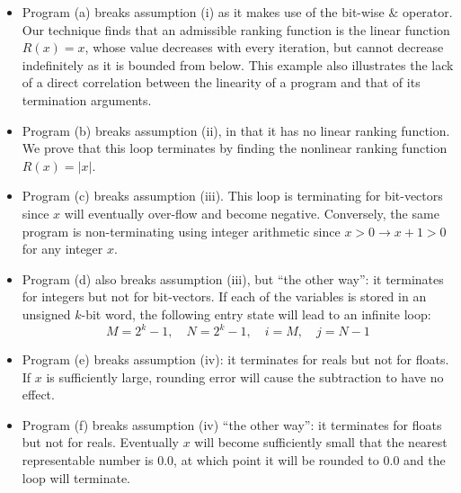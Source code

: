 \documentclass[preprint]{sigplanconf}
\theoremstyle{definition}
\begin{document}
%
\begin{itemize}

\item Program (a) breaks assumption (i) as it makes use of the bit-wise $\&$ operator.
%
Our technique finds that an admissible ranking function is the linear
function $R(x) = x$, whose value decreases with every iteration, but cannot
decrease indefinitely as it is bounded from below.  This example also
illustrates the lack of a direct correlation between the linearity of a
program and that of its termination arguments.

\item Program (b) breaks assumption (ii), in that it has no linear ranking
function.  We prove that this loop terminates by finding the nonlinear
ranking function $R(x) = |x|$.

\item Program (c) breaks assumption (iii).  This loop is terminating for
bit-vectors since $x$ will eventually over-flow and become negative. 
Conversely, the same program is non-terminating using integer arithmetic
since $x > 0 \rightarrow x+1 > 0$ for any integer $x$.

\item Program (d) also breaks assumption (iii), but ``the other way'': it
terminates for integers but not for bit-vectors.  If each of the variables
is stored in an unsigned $k$-bit word, the following entry state will lead
to an infinite loop:
%
$$ M = 2^k - 1,\quad N = 2^k - 1,\quad i = M,\quad j = N-1 $$

\item Program (e) breaks assumption (iv): it terminates for reals but not
for floats.  If $x$ is sufficiently large, rounding error will cause the
subtraction to have no effect.

\item Program (f) breaks assumption (iv) ``the other way'': it terminates
for floats but not for reals.  Eventually $x$ will become sufficiently small
that the nearest representable number is $0.0$, at which point it will be
rounded to $0.0$ and the loop will terminate.

\end{itemize}
\end{document}
